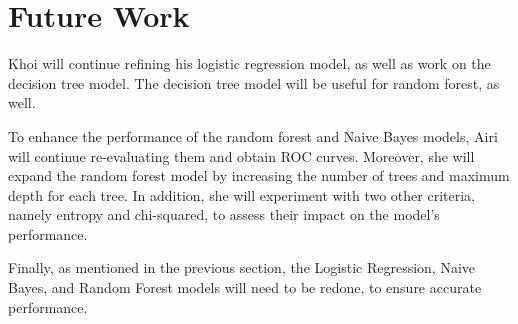 \section{Future Work}

Khoi will continue refining his logistic regression model, as well as work on the decision tree model. The decision tree model will be useful for random forest, as well.

To enhance the performance of the random forest and Naive Bayes models, Airi will continue re-evaluating them and obtain ROC curves. Moreover, she will expand the random forest model by increasing the number of trees and maximum depth for each tree. In addition, she will experiment with two other criteria, namely entropy and chi-squared, to assess their impact on the model's performance.

Finally, as mentioned in the previous section, the Logistic Regression, Naive Bayes, and Random Forest models will need to be redone, to ensure accurate performance.